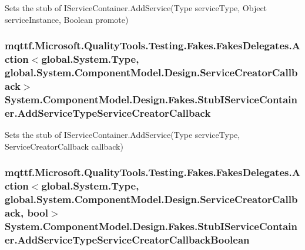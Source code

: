 Sets the stub of I\-Service\-Container.\-Add\-Service(\-Type service\-Type, Object service\-Instance, Boolean promote)

\hypertarget{class_system_1_1_component_model_1_1_design_1_1_fakes_1_1_stub_i_service_container_a112fd0835d3cb0f3e92398d5a16f16b9}{
\subsubsection[{Add\-Service\-Type\-Service\-Creator\-Callback}]{\setlength{\rightskip}{0pt plus 5cm}mqttf.\-Microsoft.\-Quality\-Tools.\-Testing.\-Fakes.\-Fakes\-Delegates.\-Action$<$global.\-System.\-Type, global.\-System.\-Component\-Model.\-Design.\-Service\-Creator\-Callback$>$ System.\-Component\-Model.\-Design.\-Fakes.\-Stub\-I\-Service\-Container.\-Add\-Service\-Type\-Service\-Creator\-Callback}}\label{class_system_1_1_component_model_1_1_design_1_1_fakes_1_1_stub_i_service_container_a112fd0835d3cb0f3e92398d5a16f16b9}


Sets the stub of I\-Service\-Container.\-Add\-Service(\-Type service\-Type, Service\-Creator\-Callback callback)

\hypertarget{class_system_1_1_component_model_1_1_design_1_1_fakes_1_1_stub_i_service_container_a045a334be60d4794d4b49b03b3d5e82f}{
\subsubsection[{Add\-Service\-Type\-Service\-Creator\-Callback\-Boolean}]{\setlength{\rightskip}{0pt plus 5cm}mqttf.\-Microsoft.\-Quality\-Tools.\-Testing.\-Fakes.\-Fakes\-Delegates.\-Action$<$global.\-System.\-Type, global.\-System.\-Component\-Model.\-Design.\-Service\-Creator\-Callback, bool$>$ System.\-Component\-Model.\-Design.\-Fakes.\-Stub\-I\-Service\-Container.\-Add\-Service\-Type\-Service\-Creator\-Callback\-Boolean}}\label{class_system_1_1_component_model_1_1_design_1_1_fakes_1_1_stub_i_service_container_a045a334be60d4794d4b49b03b3d5e82f}


